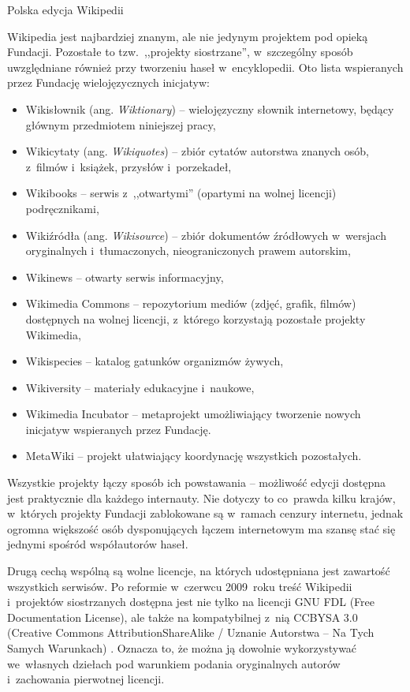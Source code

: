 \documentclass{pracamgr}
\begin{document}
\begin{illustration}
	\caption{Polska edycja Wikipedii}
\end{illustration}

Wikipedia jest najbardziej znanym, ale nie jedynym projektem pod opieką Fundacji. Pozostałe to tzw.\ ,,projekty siostrzane'', w~szczególny sposób uwzględniane również przy tworzeniu haseł w~encyklopedii. Oto lista wspieranych przez Fundację wielojęzycznych inicjatyw:
\begin{itemize}
	\item Wikisłownik (ang. \emph{Wiktionary}) -- wielojęzyczny słownik internetowy, będący głównym przedmiotem niniejszej pracy,
	\item Wikicytaty (ang. \emph{Wikiquotes}) -- zbiór cytatów autorstwa znanych osób, z~filmów i~książek, przysłów i~porzekadeł,
	\item Wikibooks -- serwis z~,,otwartymi'' (opartymi na wolnej licencji) podręcznikami,
	\item Wikiźródła (ang. \emph{Wikisource}) -- zbiór dokumentów źródłowych w~wersjach oryginalnych i~tłumaczonych, nieograniczonych prawem autorskim,
	\item Wikinews -- otwarty serwis informacyjny,
	\item Wikimedia Commons -- repozytorium mediów (zdjęć, grafik, filmów) dostępnych na wolnej licencji, z~którego korzystają pozostałe projekty Wikimedia,
	\item Wikispecies -- katalog gatunków organizmów żywych,
	\item Wikiversity -- materiały edukacyjne i~naukowe,
	\item Wikimedia Incubator -- metaprojekt umożliwiający tworzenie nowych inicjatyw wspieranych przez Fundację.
	\item Meta\dywiz{}Wiki -- projekt ułatwiający koordynację wszystkich pozostałych.
\end{itemize}
Wszystkie projekty łączy sposób ich powstawania -- możliwość edycji dostępna jest praktycznie dla każdego internauty. Nie dotyczy to co~prawda kilku krajów, w~których projekty Fundacji zablokowane są w~ramach cenzury internetu, jednak ogromna większość osób dysponujących łączem internetowym ma szansę stać się jednymi spośród współautorów haseł.

Drugą cechą wspólną są wolne licencje, na których udostępniana jest zawartość wszystkich serwisów. Po reformie w~czerwcu 2009~roku treść Wikipedii i~projektów siostrzanych dostępna jest nie tylko na licencji GNU FDL (Free Documentation License), ale także na kompatybilnej z~nią CC\dywiz{}BY\dywiz{}SA 3.0 (Creative Commons Attribution\dywiz{}ShareAlike / Uznanie Autorstwa -- Na Tych Samych Warunkach) \cite{wiki:license}.
Oznacza to, że można ją dowolnie wykorzystywać we~własnych dziełach pod warunkiem podania oryginalnych autorów i~zachowania pierwotnej licencji.
\end{document}
